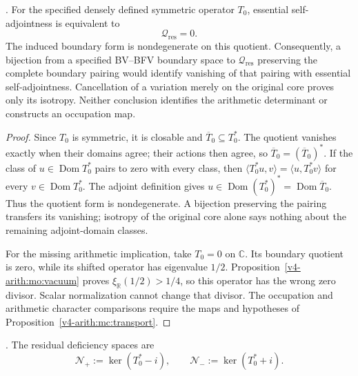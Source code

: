 \begin{proposition}
\label{v4-arith:w9-r4:prop:polyakov-boundary-target}
\ClaimStatusProvedHere. For the specified densely defined symmetric
operator $T_0$, essential self-adjointness is equivalent to
\begin{equation}
\label{v4-arith:w9-r4:eq:polyakov-boundary-target}
 \mathcal Q_{\mathrm{res}}=0.
\end{equation}
The induced boundary form is nondegenerate on this quotient.
Consequently, a bijection from a specified BV--BFV boundary space
to $\mathcal Q_{\mathrm{res}}$ preserving the complete boundary
pairing would identify vanishing of that pairing with essential
self-adjointness. Cancellation of a variation merely on the original
core proves only its isotropy. Neither conclusion identifies the
arithmetic determinant or constructs an occupation map.
\end{proposition}
\begin{proof}
Since $T_0$ is symmetric, it is closable and
$\overline T_0\subseteq T_0^*$. The quotient vanishes exactly when
their domains agree; their actions then agree, so
$\overline T_0=(\overline T_0)^*$.
If the class of $u\in\operatorname{Dom}T_0^*$ pairs to zero with
every class, then
$\langle T_0^*u,v\rangle=\langle u,T_0^*v\rangle$ for every
$v\in\operatorname{Dom}T_0^*$. The adjoint definition gives
$u\in\operatorname{Dom}(T_0^*)^*=\operatorname{Dom}\overline T_0$.
Thus the quotient form is nondegenerate. A bijection preserving
the pairing transfers its vanishing; isotropy of the original
core alone says nothing about the remaining adjoint-domain classes.

For the missing arithmetic implication, take $T_0=0$ on
$\mathbb C$. Its boundary quotient is zero, while its shifted
operator has eigenvalue $1/2$. Proposition~\ref{v4-arith:mo:vacuum}
proves $\xi_{\mathbb R}(1/2)>1/4$, so this operator has the wrong
zero divisor. Scalar normalization cannot change that divisor.
The occupation and arithmetic character comparisons require
the maps and hypotheses of Proposition~\ref{v4-arith:mc:transport}.
\end{proof}

\begin{definition}
\label{v4-arith:w9-r4:def:deficiency-spaces}
\ClaimStatusDefinitional. The residual deficiency spaces are
\begin{equation}
\label{v4-arith:w9-r4:eq:deficiency-spaces}
\mathcal{N}_{+}:=\ker(T_{0}^{*}-i),
\qquad
\mathcal{N}_{-}:=\ker(T_{0}^{*}+i).
\end{equation}
\end{definition}

